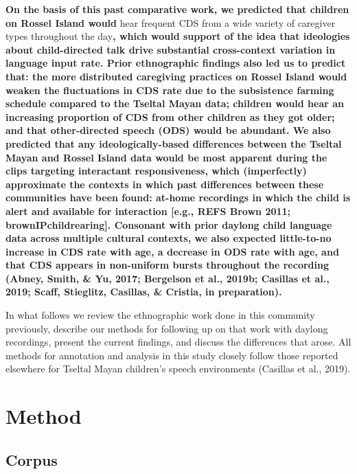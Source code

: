 \documentclass[,man,floatsintext]{apa6}
\begin{document}
\textbf{On the basis of this past comparative work, we predicted that
children on Rossel Island would} hear frequent CDS from a wide variety
of caregiver types throughout the day\textbf{, which would support of
the idea that ideologies about child-directed talk drive substantial
cross-context variation in language input rate. Prior ethnographic
findings also led us to predict that: the more distributed caregiving
practices on Rossel Island would weaken the fluctuations in CDS rate due
to the subsistence farming schedule compared to the Tseltal Mayan data;
children would hear an increasing proportion of CDS from other children
as they got older; and that other-directed speech (ODS) would be
abundant. We also predicted that any ideologically-based differences
between the Tseltal Mayan and Rossel Island data would be most apparent
during the clips targeting interactant responsiveness, which
(imperfectly) approximate the contexts in which past differences between
these communities have been found: at-home recordings in which the child
is alert and available for interaction {[}e.g., REFS Brown 2011;
brownIPchildrearing{]}. Consonant with prior daylong child language data
across multiple cultural contexts, we also expected little-to-no
increase in CDS rate with age, a decrease in ODS rate with age, and that
CDS appears in non-uniform bursts throughout the recording (Abney,
Smith, \& Yu, 2017; Bergelson et al., 2019b; Casillas et al., 2019;
Scaff, Stieglitz, Casillas, \& Cristia, in preparation).}

In what follows we review the ethnographic work done in this community
previously, describe our methods for following up on that work with
daylong recordings, present the current findings, and discuss the
differences that arose. All methods for annotation and analysis in this
study closely follow those reported elsewhere for Tseltal Mayan
children's speech environments (Casillas et al., 2019).

\section{Method}\label{methods}

\subsection{Corpus}\label{methods-dataset}
\end{document}
